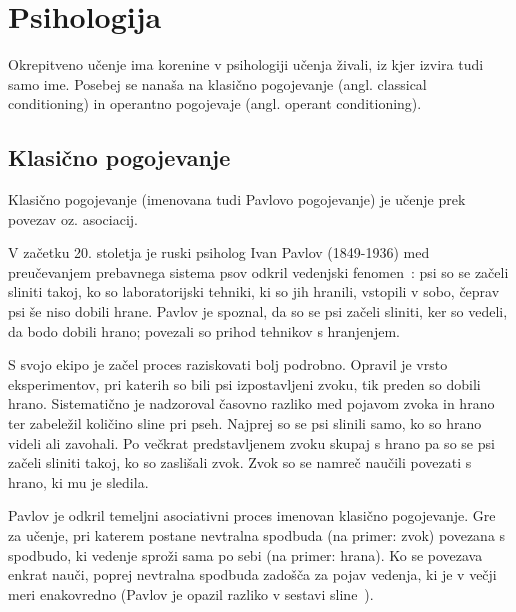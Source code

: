 \documentclass[a4paper, oneside, 12pt]{report}
\begin{document}
\section{Psihologija} \label{section:Psychology}
Okrepitveno učenje ima korenine v psihologiji učenja živali, iz kjer izvira tudi samo ime. Posebej se nanaša na klasično pogojevanje (angl. classical conditioning) in operantno pogojevaje (angl. operant conditioning).

\subsection{Klasično pogojevanje}
Klasično pogojevanje (imenovana tudi Pavlovo pogojevanje) je učenje prek povezav oz. asociacij.

V začetku 20. stoletja je ruski psiholog Ivan Pavlov (1849-1936) med preučevanjem prebavnega sistema psov odkril vedenjski fenomen~\cite{ConditionedReflexes}: psi so se začeli sliniti takoj, ko so laboratorijski tehniki, ki so jih hranili, vstopili v sobo, čeprav psi še niso dobili hrane. Pavlov je spoznal, da so se psi začeli sliniti, ker so vedeli, da bodo dobili hrano; povezali so prihod tehnikov s hranjenjem.

S svojo ekipo je začel proces raziskovati bolj podrobno. Opravil je vrsto eksperimentov, pri katerih so bili psi izpostavljeni zvoku, tik preden so dobili hrano. Sistematično je nadzoroval časovno razliko med pojavom zvoka in hrano ter zabeležil količino sline pri pseh. Najprej so se psi slinili samo, ko so hrano videli ali zavohali. Po večkrat predstavljenem zvoku skupaj s hrano pa so se psi začeli sliniti takoj, ko so zaslišali zvok. Zvok so se namreč naučili povezati s hrano, ki mu je sledila.

Pavlov je odkril temeljni asociativni proces imenovan klasično pogojevanje. Gre za učenje, pri katerem postane nevtralna spodbuda (na primer: zvok) povezana s spodbudo, ki vedenje sproži sama po sebi (na primer: hrana). Ko se povezava enkrat nauči, poprej nevtralna spodbuda zadošča za pojav vedenja, ki je v večji meri enakovredno (Pavlov je opazil razliko v sestavi sline~\cite{PavlovianConditioningItsNotWhatYouThinkItIs, LearningAndBehaviorAContemporarySynthesis, CognitionEvolutionAndBehavior}).
\end{document}
